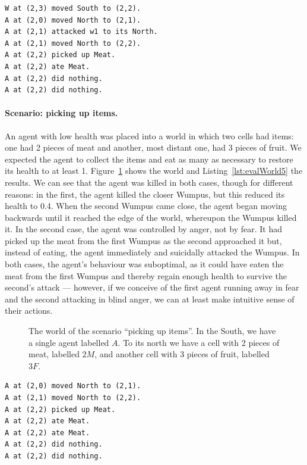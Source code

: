\noindent
\begin{minipage}{\linewidth}
\begin{lstlisting}[caption=Actions in the scenario ``killing a wounded Wumpus''., label=lst:evalWorld4]
W at (2,3) moved South to (2,2).
A at (2,0) moved North to (2,1).
A at (2,1) attacked w1 to its North.
A at (2,1) moved North to (2,2).
A at (2,2) picked up Meat.
A at (2,2) ate Meat.
A at (2,2) did nothing.
A at (2,2) did nothing.
\end{lstlisting}
\end{minipage}

\paragraph{Scenario: picking up items.} An agent with low health was placed into a world in which two cells had items: one had 2 pieces of meat and another, most distant one, had 3 pieces of fruit. We expected the agent to collect the items and eat as many as necessary to restore its health to at least 1. Figure~\ref{fig:evalWorld5} shows the world and Listing~\ref{lst:evalWorld5} the results. We can see that the agent was killed in both cases, though for different reasons: in the first, the agent killed the closer Wumpus, but this reduced its health to 0.4. When the second Wumpus came close, the agent began moving backwards until it reached the edge of the world, whereupon the Wumpus killed it. In the second case, the agent was controlled by anger, not by fear. It had picked up the meat from the first Wumpus as the second approached it but, instead of eating, the agent immediately and suicidally attacked the Wumpus. In both cases, the agent's behaviour was suboptimal, as it could have eaten the meat from the first Wumpus and thereby regain enough health to survive the second's attack --- however, if we conceive of the first agent running away in fear and the second attacking in blind anger, we can at least make intuitive sense of their actions.

\begin{figure}
	\centering
	
	\caption{The world of the scenario ``picking up items''. In the South, we have a single agent labelled $A$. To its north we have a cell with 2 pieces of meat, labelled $2M$, and another cell with 3 pieces of fruit, labelled $3F$.}
	\label{fig:evalWorld5}
\end{figure}

\begin{lstlisting}[caption=Actions in the scenario ``picking up items''., label=lst:evalWorld5]
A at (2,0) moved North to (2,1).
A at (2,1) moved North to (2,2).
A at (2,2) picked up Meat.
A at (2,2) ate Meat.
A at (2,2) ate Meat.
A at (2,2) did nothing.
A at (2,2) did nothing.
\end{lstlisting}

